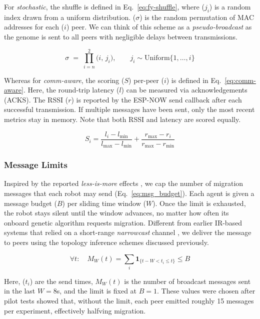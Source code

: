 \documentclass[conference]{IEEEtran}
\begin{document}
For \emph{stochastic}, the shuffle is defined in Eq.~\ref{eq:fy-shuffle}, where ($j_i$) is a random index drawn from a uniform distribution. ($\sigma$) is the random permutation of MAC addresses for each ($i$) peer. We can think of this scheme as a \emph{pseudo-broadcast} as the genome is sent to all peers with negligible delays between transmissions.

\begin{equation}\label{eq:fy-shuffle}
\sigma \;=\; \prod_{i=n}^{2} \bigl(i,\, j_i\bigr), 
\qquad j_i \sim \mathrm{Uniform}\{1,\dots,i\}
\end{equation}

Whereas for \emph{comm-aware}, the scoring ($S$) per-peer ($i$) is defined in Eq.~\ref{eq:comm-aware}. Here, the round-trip latency ($l$) can be measured via acknowledgements (ACKS). The RSSI ($r$) is reported by the ESP-NOW send callback after each successful transmission. If multiple messages have been sent, only the most recent metrics stay in memory. Note that both RSSI and latency are scored equally.

\begin{equation}\label{eq:comm-aware}
S_i =
\frac{l_i - l_{\min}}{l_{\max} - l_{\min}} +
\frac{r_{\max} - r_i}{r_{\max} - r_{\min}}
\end{equation}

\subsubsection{Message Limits}\label{sec:limited-rate}

Inspired by the reported \emph{less-is-more} effects \cite{aust_hidden_2022}, we cap the number of migration messages that each robot may send (Eq.~\ref{eq:msg_budget}). Each agent is given a message budget ($B$) per sliding time window ($W$). Once the limit is exhausted, the robot stays silent until the window advances, no matter how often its onboard genetic algorithm requests migration.  Different from earlier IR-based systems that relied on a short-range \emph{narrowcast} channel \cite{aust_hidden_2022}, we deliver the message to peers using the topology inference schemes discussed previously.

\begin{equation}\label{eq:msg_budget}
\forall t:\quad M_W(t)=\sum_{i}\mathbf{1}_{\{t-W< t_i \le t\}} \le B
\end{equation}

Here, ($t_i$) are the send times, $M_W(t)$ is the number of broadcast messages sent in the last $W=8$s, and the limit is fixed at $B=1$. These values were chosen after pilot tests showed that, without the limit, each peer emitted roughly 15 messages per experiment, effectively halfving migration. \\
\end{document}
